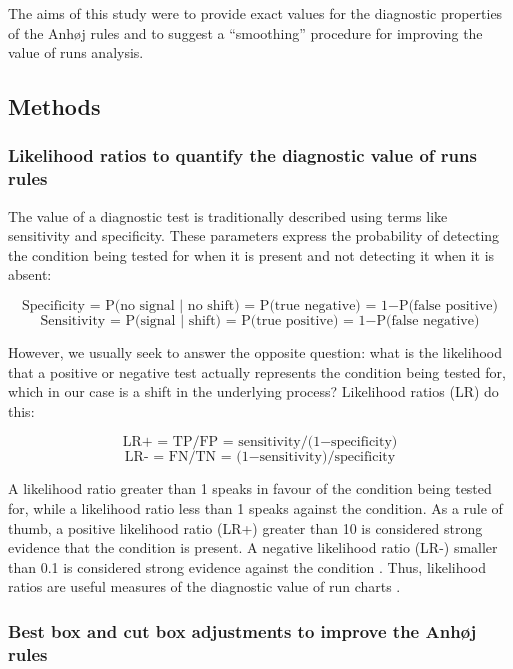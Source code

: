 The aims of this study were to provide exact values for the diagnostic
properties of the Anhøj rules and to suggest a ``smoothing'' procedure
for improving the value of runs analysis.

\hypertarget{methods}{%
\subsection{Methods}\label{methods}}

\hypertarget{likelihood-ratios-to-quantify-the-diagnostic-value-of-runs-rules}{%
\subsubsection{Likelihood ratios to quantify the diagnostic value of
runs
rules}\label{likelihood-ratios-to-quantify-the-diagnostic-value-of-runs-rules}}

The value of a diagnostic test is traditionally described using terms
like sensitivity and specificity. These parameters express the
probability of detecting the condition being tested for when it is
present and not detecting it when it is absent:

\[ \text{Specificity = P(no signal | no shift) = P(true negative) = 1} - \text{P(false positive)} \]
\[ \text{Sensitivity = P(signal | shift) = P(true positive) = 1} - \text{P(false negative)} \]

However, we usually seek to answer the opposite question: what is the
likelihood that a positive or negative test actually represents the
condition being tested for, which in our case is a shift in the
underlying process? Likelihood ratios (LR) do this:

\[ \text{LR+ = TP/FP = sensitivity/(1} - \text{specificity)} \]
\[ \text{LR- = FN/TN = (1} - \text{sensitivity)/specificity} \]

A likelihood ratio greater than 1 speaks in favour of the condition
being tested for, while a likelihood ratio less than 1 speaks against
the condition. As a rule of thumb, a positive likelihood ratio (LR+)
greater than 10 is considered strong evidence that the condition is
present. A negative likelihood ratio (LR-) smaller than 0.1 is
considered strong evidence against the condition \citep{deeks2004}.
Thus, likelihood ratios are useful measures of the diagnostic value of
run charts \citep{anhoej2015, anhoej2018}.

\hypertarget{best-box-and-cut-box-adjustments-to-improve-the-anhj-rules}{%
\subsubsection{Best box and cut box adjustments to improve the Anhøj
rules}\label{best-box-and-cut-box-adjustments-to-improve-the-anhj-rules}}

